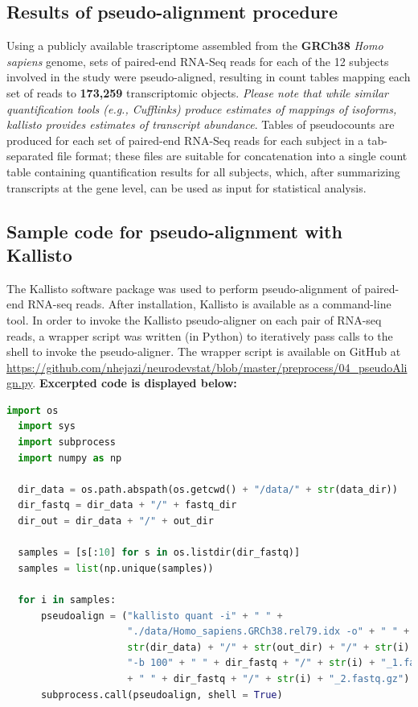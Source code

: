 \documentclass[11pt]{article}
\begin{document}
\subsection{Results of pseudo-alignment procedure}
Using a publicly
available trascriptome assembled from the \textbf{GRCh38} \textit{Homo sapiens}
genome, sets of paired-end RNA-Seq reads for each of the 12 subjects involved in
the study were pseudo-aligned, resulting in count tables mapping each set of
reads to \textbf{173,259} transcriptomic objects. \textit{Please note that while
similar quantification tools (e.g., Cufflinks) produce estimates of mappings of
isoforms, kallisto provides estimates of transcript abundance}. Tables of
pseudocounts are produced for each set of paired-end RNA-Seq reads for each
subject in a tab-separated file format; these files are suitable for
concatenation into a single count table containing quantification results for
all subjects, which, after summarizing transcripts at the gene level, can be
used as input for statistical analysis.


\subsection{Sample code for pseudo-alignment with Kallisto}
The Kallisto software package was used to perform pseudo-alignment of paired-end
RNA-seq reads. After installation, Kallisto is available as a command-line tool.
In order to invoke the Kallisto pseudo-aligner on each pair of RNA-seq reads, a
wrapper script was written (in Python) to iteratively pass calls to the shell
to invoke the pseudo-aligner. The wrapper script is available on GitHub at
\url{https://github.com/nhejazi/neurodevstat/blob/master/preprocess/04_pseudoAlign.py}.
\textbf{Excerpted code is displayed below:}

\begin{lstlisting}[language=Python]
  import os
  import sys
  import subprocess
  import numpy as np

  dir_data = os.path.abspath(os.getcwd() + "/data/" + str(data_dir))
  dir_fastq = dir_data + "/" + fastq_dir
  dir_out = dir_data + "/" + out_dir

  samples = [s[:10] for s in os.listdir(dir_fastq)]
  samples = list(np.unique(samples))

  for i in samples:
      pseudoalign = ("kallisto quant -i" + " " +
                     "./data/Homo_sapiens.GRCh38.rel79.idx -o" + " " +
                     str(dir_data) + "/" + str(out_dir) + "/" + str(i) + " " +
                     "-b 100" + " " + dir_fastq + "/" + str(i) + "_1.fastq.gz"
                     + " " + dir_fastq + "/" + str(i) + "_2.fastq.gz")
      subprocess.call(pseudoalign, shell = True)
\end{lstlisting}
\end{document}
